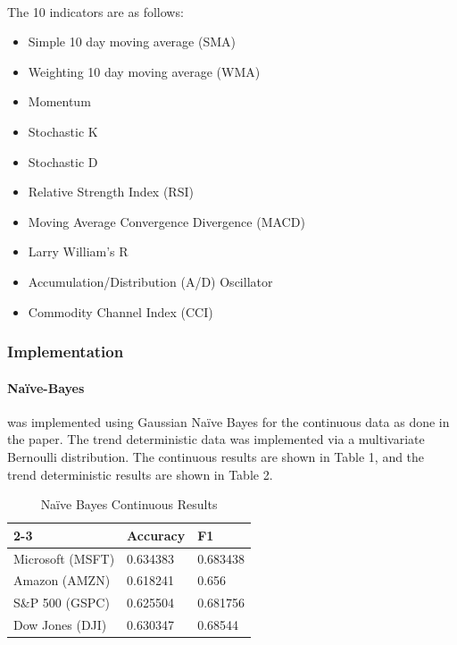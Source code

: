 \documentclass[11pt]{article}
\begin{document}
				\paragraph{} The 10 indicators are as follows:
			
				\begin{itemize}
					\item Simple 10 day moving average (SMA) 
					\item Weighting 10 day moving average (WMA) 
					\item Momentum 
					\item Stochastic K%
					\item Stochastic D%
					\item Relative Strength Index (RSI) 
					\item Moving Average Convergence Divergence (MACD) 
					\item Larry William’s R%
					\item Accumulation/Distribution (A/D) Oscillator  
					\item Commodity Channel Index (CCI) 
				\end{itemize}
			
			\subsubsection{Implementation}
			
				\paragraph{Naïve-Bayes} was implemented using Gaussian Naïve Bayes for the continuous data as done in the paper. The trend deterministic data was implemented via a multivariate Bernoulli distribution. The continuous results are shown in Table 1, and the trend deterministic results are shown in Table 2.
			
				\begin{table}[h]
					\centering
					\begin{tabular}{l|l|l|}
						\cline{2-3}
						& Accuracy & F1       \\ \hline
						\multicolumn{1}{|l|}{Microsoft (MSFT)} & 0.634383 & 0.683438 \\ \hline
						\multicolumn{1}{|l|}{Amazon (AMZN)}    & 0.618241 & 0.656    \\ \hline
						\multicolumn{1}{|l|}{S\&P 500 (GSPC)}  & 0.625504 & 0.681756 \\ \hline
						\multicolumn{1}{|l|}{Dow Jones (DJI)}  & 0.630347 & 0.68544  \\ \hline
					\end{tabular}
					\caption{Naïve Bayes Continuous Results}
				\end{table}
			
\end{document}
